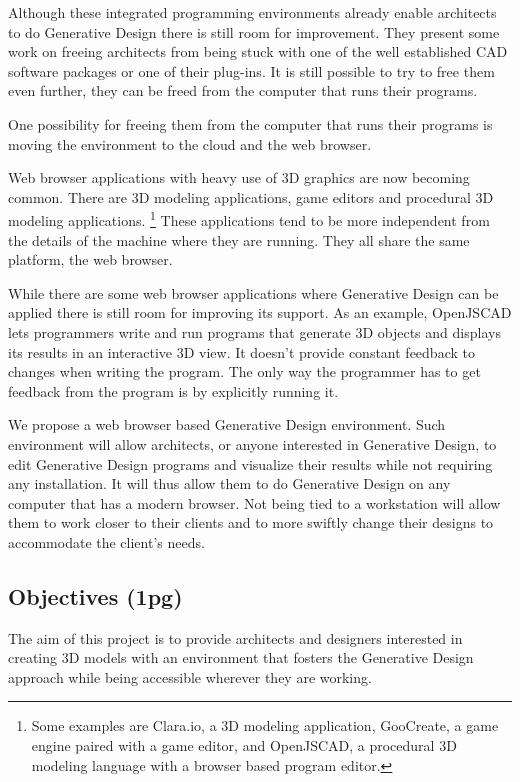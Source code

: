 \documentclass{./llncs2e/llncs}
\begin{document}
	Although these integrated programming environments already enable architects to do Generative Design there is still room for improvement.
	They present some work on freeing architects from being stuck with one of the well established CAD software packages or one of their plug-ins.
	It is still possible to try to free them even further, they can be freed from the computer that runs their programs.

	One possibility for freeing them from the computer that runs their programs is moving the environment to the cloud and the web browser.


	Web browser applications with heavy use of 3D graphics are now becoming common.
	There are 3D modeling applications, game editors and procedural 3D modeling applications.
	\footnote{Some examples are Clara.io, a 3D modeling application, GooCreate, a game engine paired with a game editor, and OpenJSCAD, a procedural 3D modeling language with a browser based program editor.}
	These applications tend to be more independent from the details of the machine where they are running.
	They all share the same platform, the web browser.

	While there are some web browser applications where Generative Design can be applied there is still room for improving its support.
	As an example, OpenJSCAD lets programmers write and run programs that generate 3D objects and displays its results in an interactive 3D view.
	It doesn't provide constant feedback to changes when writing the program.
	The only way the programmer has to get feedback from the program is by explicitly running it.

	We propose a web browser based Generative Design environment. 
	Such environment will allow architects, or anyone interested in Generative Design, to edit Generative Design programs and visualize their results while not requiring any installation. 
	It will thus allow them to do Generative Design on any computer that has a modern browser. 
	Not being tied to a workstation will allow them to work closer to their clients and to more swiftly change their designs to accommodate the client's needs.

\subsection{Objectives (1pg)}
	The aim of this project is to provide architects and designers interested in creating 3D models with an environment that fosters the Generative Design approach while being accessible wherever they are working.
\end{document}
